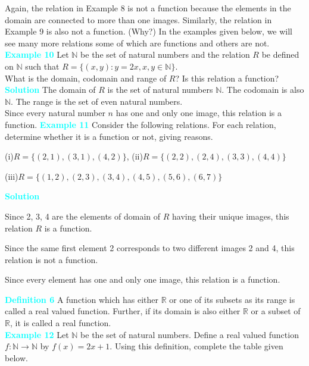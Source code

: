 \documentclass[11pt]{article}
\begin{document}
\vspace{5pt}
 Again, the relation in Example 8 is not a function because the elements in the domain are connected to more than one images. Similarly, the relation in Example 9 is also not a function. (Why?) In the examples given below, we will see many more relations some of which are functions and others are not.
\textcolor{cyan}{
\noindent \textbf{Example 10}} Let $\mathbb{N}$ be the set of natural numbers and the relation $R$ be defined on $\mathbb{N}$ such that $R = \{(x, y) : y = 2x, x, y \in \mathbb{N}\}$. \\
What is the domain, codomain and range of $R$? Is this relation a function?
\vspace{5pt}
\textcolor{cyan}{
\noindent \textbf{Solution}} The domain of $R$ is the set of natural numbers $\mathbb{N}$. The codomain is also $\mathbb{N}$. The range is the set of even natural numbers. \\
Since every natural number $n$ has one and only one image, this relation is a function.
\vspace{15pt}
\textcolor{cyan}{\textbf{Example 11}}  
Consider the following relations. For each relation, determine whether it is a function or not, giving reasons.
\medskip
\begin{center}
(i)\quad $R = \{(2,1),(3,1),(4,2)\}$, (ii)\quad $R = \{(2,2),(2,4),(3,3),(4,4)\}$
\end{center}
\begin{center}
    (iii)\quad $R = \{(1,2),(2,3),(3,4),(4,5),(5,6),(6,7)\}$
\end{center}
\vspace{0.35cm}
\noindent\textcolor{cyan}{\textbf{Solution}}
\begin{enumerate*}[label=(\roman*), itemjoin=\quad, itemjoin*=\quad]
\item Since 2, 3, 4 are the elements of domain of $R$ having their unique images, this relation $R$ is a function.\\
\item Since the same first element 2 corresponds to two different images 2 and 4, this relation is not a function.\\
\item Since every element has one and only one image, this relation is a function.
\end{enumerate*}
\vspace{0.45cm}
\colorbox{ncertblue}{\textcolor{cyan}{\textbf{Definition 6}}}\hspace{0.5em} A function which has either $\mathbb{R}$ or one of its subsets as its range is called a real valued function. Further, if its domain is also either $\mathbb{R}$ or a subset of $\mathbb{R}$, it is called a real function.\\
 \textcolor{cyan}{\textbf{Example 12}} 
Let $\mathbb{N}$ be the set of natural numbers. Define a real valued function
$f : \mathbb{N} \to \mathbb{N}$ by $f(x) = 2x + 1$. Using this definition,
complete the table given below.
\end{document}
